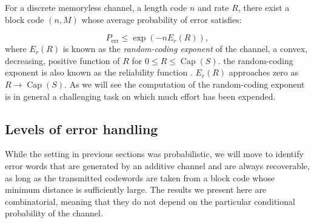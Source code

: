 \indent For a discrete memoryless channel, a length code $n$ and rate $R$, there exist a block code $(n,M)$ whose average probability of error satisfies:

\begin{equation}
P_{\text{err}}\leq \operatorname{exp}(-n E_{r}(R)),
\label{CH2:randomexpoenent}
\end{equation}
where $E_r(R)$ is known as the \textit{random-coding exponent} of the channel, a convex, decreasing, positive function of $R$ for $0\leq R\leq \operatorname{Cap}(S)$. the random-coding exponent is also known as the reliability function \cite{gallager_information_1968, gallager_random_2006}. $E_r(R)$ approaches zero as $R\to  \operatorname{Cap}(S)$. As we will see the computation of the random-coding exponent is in general a challenging task on which much effort has been expended.


\subsection{Levels of error handling}
While the setting in previous sections was probabilistic, we will move to identify error words that are generated by an additive channel and are always recoverable, as long as the transmitted codewords are taken from a block code whose minimum distance is sufficiently large. The results we present here are combinatorial, meaning that they do not depend on the particular conditional probability of the channel.
